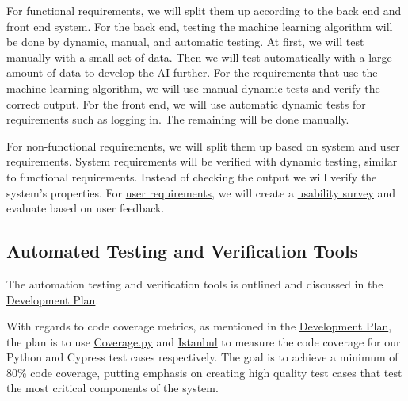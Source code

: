 \documentclass[12pt, titlepage]{article}
\begin{document}
For functional requirements, we will split them up according to the back end and
front end system. For the back end, testing the machine learning algorithm will
be done by dynamic, manual, and automatic testing. At first, we will test
manually with a small set of data. Then we will test automatically with a large
amount of data to develop the AI further. For the requirements that use the
machine learning algorithm, we will use manual dynamic tests and verify the
correct output. For the front end, we will use automatic dynamic tests for
requirements such as logging in. The remaining will be done manually.

For non-functional requirements, we will split them up based on system and user
requirements. System requirements will be verified with dynamic testing, similar
to functional requirements. Instead of checking the output we will verify the
system's properties. For \hyperref[sec:5.2.2]{user requirements}, we will create
a \hyperref[sec:7.2]{usability survey} and evaluate based on user feedback.

\subsection{Automated Testing and Verification Tools}
\label{sec:automation}



  
The automation testing and verification tools is outlined and discussed in the
\href{https://github.com/parkd-app/park-d/blob/main/docs/DevelopmentPlan/DevelopmentPlan.pdf}{Development
Plan}.

With regards to code coverage metrics, as mentioned in the
\href{https://github.com/parkd-app/park-d/blob/main/docs/DevelopmentPlan/DevelopmentPlan.pdf}{Development
Plan}, the plan is to use
\href{https://coverage.readthedocs.io/en/6.5.0/}{Coverage.py} and
\href{https://istanbul.js.org/}{Istanbul} to measure the code coverage for our
Python and Cypress test cases respectively. The goal is to achieve a minimum of
80\% code coverage, putting emphasis on creating high quality test cases that
test the most critical components of the system.
\end{document}

